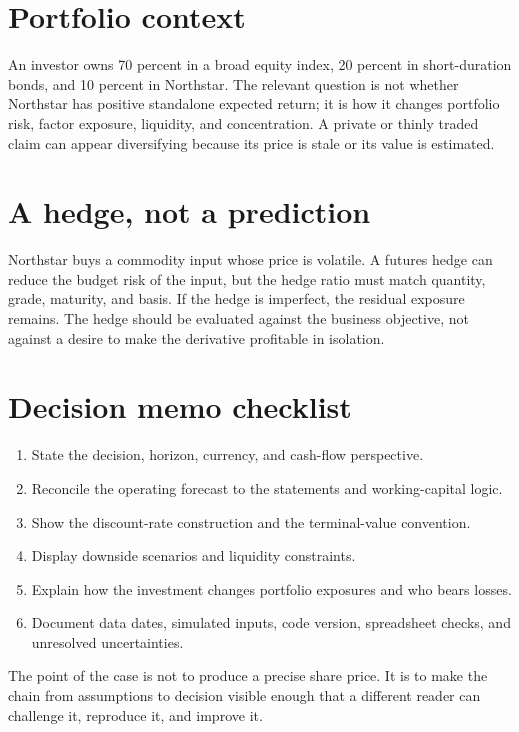 \section{Portfolio context}
An investor owns 70 percent in a broad equity index, 20 percent in short-duration bonds, and 10 percent in Northstar. The relevant question is not whether Northstar has positive standalone expected return; it is how it changes portfolio risk, factor exposure, liquidity, and concentration. A private or thinly traded claim can appear diversifying because its price is stale or its value is estimated.

\section{A hedge, not a prediction}
Northstar buys a commodity input whose price is volatile. A futures hedge can reduce the budget risk of the input, but the hedge ratio must match quantity, grade, maturity, and basis. If the hedge is imperfect, the residual exposure remains. The hedge should be evaluated against the business objective, not against a desire to make the derivative profitable in isolation.

\section{Decision memo checklist}
\begin{enumerate}
  \item State the decision, horizon, currency, and cash-flow perspective.
  \item Reconcile the operating forecast to the statements and working-capital logic.
  \item Show the discount-rate construction and the terminal-value convention.
  \item Display downside scenarios and liquidity constraints.
  \item Explain how the investment changes portfolio exposures and who bears losses.
  \item Document data dates, simulated inputs, code version, spreadsheet checks, and unresolved uncertainties.
\end{enumerate}

The point of the case is not to produce a precise share price. It is to make the chain from assumptions to decision visible enough that a different reader can challenge it, reproduce it, and improve it.
